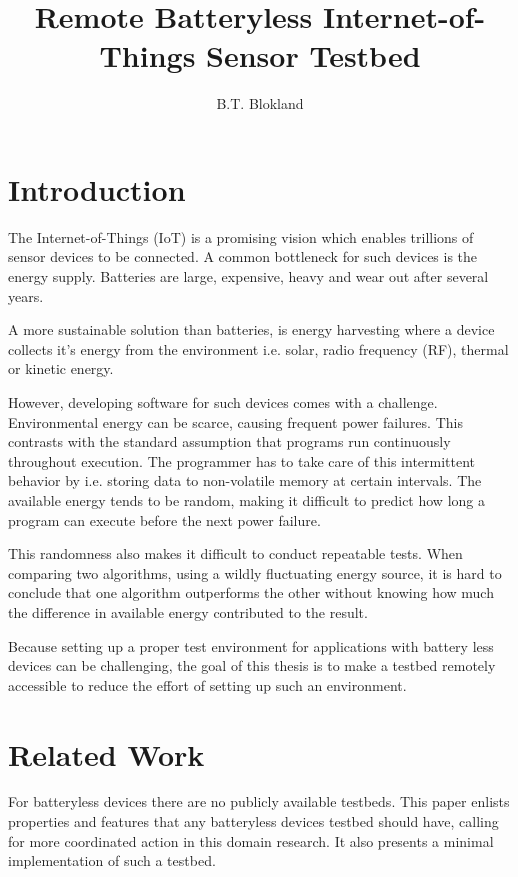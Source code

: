 \documentclass[]{article}
\title{Remote Batteryless Internet-of-Things Sensor Testbed}
\author{B.T. Blokland}
\begin{document}
\maketitle

\section{Introduction}

The Internet-of-Things (IoT) is a promising vision which enables trillions of sensor devices to be connected. A common bottleneck for such devices is the energy supply. Batteries are large, expensive, heavy and wear out after several years.

A more sustainable solution than batteries, is energy harvesting where a device collects it's energy from the environment i.e. solar, radio frequency (RF), thermal or kinetic energy.

However, developing software for such devices comes with a challenge. Environmental energy can be scarce, causing frequent power failures. This contrasts with the standard assumption that programs run continuously throughout execution. The programmer has to take care of this intermittent behavior by i.e. storing data to non-volatile memory at certain intervals. The available energy tends to be random, making it difficult to predict how long a program can execute before the next power failure. 

This randomness also makes it difficult to conduct repeatable tests. When comparing two algorithms, using a wildly fluctuating energy source, it is hard to conclude that one algorithm outperforms the other without knowing how much the difference in available energy contributed to the result.

Because setting up a proper test environment for applications with battery less devices can be challenging, the goal of this thesis is to make a testbed remotely accessible to reduce the effort of setting up such an environment. 
 
\section{Related Work}

For batteryless devices there are no publicly available testbeds. This paper \cite{request} enlists properties and features that any batteryless devices testbed should have, calling for more coordinated action in this domain research. It also presents a minimal implementation of such a testbed.
\end{document}
